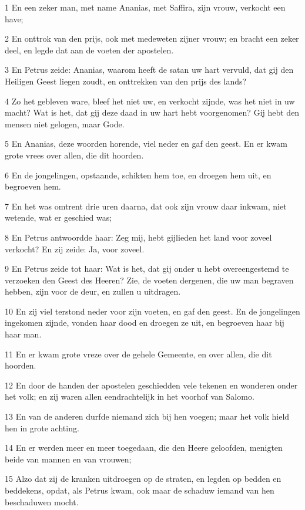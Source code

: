 \par 1 En een zeker man, met name Ananias, met Saffira, zijn vrouw, verkocht een have;
\par 2 En onttrok van den prijs, ook met medeweten zijner vrouw; en bracht een zeker deel, en legde dat aan de voeten der apostelen.
\par 3 En Petrus zeide: Ananias, waarom heeft de satan uw hart vervuld, dat gij den Heiligen Geest liegen zoudt, en onttrekken van den prijs des lands?
\par 4 Zo het gebleven ware, bleef het niet uw, en verkocht zijnde, was het niet in uw macht? Wat is het, dat gij deze daad in uw hart hebt voorgenomen? Gij hebt den mensen niet gelogen, maar Gode.
\par 5 En Ananias, deze woorden horende, viel neder en gaf den geest. En er kwam grote vrees over allen, die dit hoorden.
\par 6 En de jongelingen, opstaande, schikten hem toe, en droegen hem uit, en begroeven hem.
\par 7 En het was omtrent drie uren daarna, dat ook zijn vrouw daar inkwam, niet wetende, wat er geschied was;
\par 8 En Petrus antwoordde haar: Zeg mij, hebt gijlieden het land voor zoveel verkocht? En zij zeide: Ja, voor zoveel.
\par 9 En Petrus zeide tot haar: Wat is het, dat gij onder u hebt overeengestemd te verzoeken den Geest des Heeren? Zie, de voeten dergenen, die uw man begraven hebben, zijn voor de deur, en zullen u uitdragen.
\par 10 En zij viel terstond neder voor zijn voeten, en gaf den geest. En de jongelingen ingekomen zijnde, vonden haar dood en droegen ze uit, en begroeven haar bij haar man.
\par 11 En er kwam grote vreze over de gehele Gemeente, en over allen, die dit hoorden.
\par 12 En door de handen der apostelen geschiedden vele tekenen en wonderen onder het volk; en zij waren allen eendrachtelijk in het voorhof van Salomo.
\par 13 En van de anderen durfde niemand zich bij hen voegen; maar het volk hield hen in grote achting.
\par 14 En er werden meer en meer toegedaan, die den Heere geloofden, menigten beide van mannen en van vrouwen;
\par 15 Alzo dat zij de kranken uitdroegen op de straten, en legden op bedden en beddekens, opdat, als Petrus kwam, ook maar de schaduw iemand van hen beschaduwen mocht.
